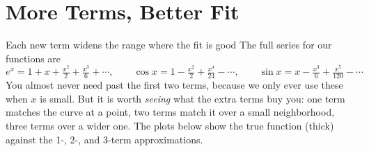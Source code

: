 \documentclass[11pt]{article}
\theoremstyle{mystyle}
\begin{document}
\section{More Terms, Better Fit}

\begin{psidea}{Each new term widens the range where the fit is good}{}
The full series for our functions are
\[
e^x = 1 + x + \tfrac{x^2}{2} + \tfrac{x^3}{6} + \cdots,\qquad
\cos x = 1 - \tfrac{x^2}{2} + \tfrac{x^4}{24} - \cdots,\qquad
\sin x = x - \tfrac{x^3}{6} + \tfrac{x^5}{120} - \cdots
\]
You almost never need past the first two terms, because we only ever use these when $x$
is small. But it is worth \emph{seeing} what the extra terms buy you: one term matches
the curve at a point, two terms match it over a small neighborhood, three terms over a
wider one. The plots below show the true function (thick) against the 1-, 2-, and
3-term approximations.
\end{psidea}
\end{document}
